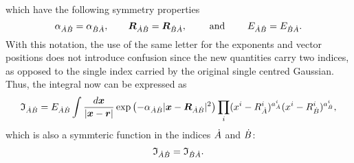 %
which have the following symmetry properties
\begin{equation}
   \alpha_{\dot{A}\dot{B}}=\alpha_{\dot{B}\dot{A}},\qquad\boldsymbol{R}_{\dot{A}\dot{B}}=\boldsymbol{R}_{\dot{B}\dot{A}},\qquad\textrm{ and }
   \qquad E_{\dot{A}\dot{B}}=E_{\dot{B}\dot{A}}.
\end{equation}
With this notation, the use of the same letter for the exponents and vector positions does not introduce confusion since the new quantities carry two indices, as opposed to the single index carried by the original single centred Gaussian. Thus, the integral now can be expressed as
%
\begin{equation}\label{eq:iabred}
   \mathfrak{I}_{\dot{A}\dot{B}}=E_{\dot{A}\dot{B}}\int\frac{d\boldsymbol{x}}{|\boldsymbol{x}-\boldsymbol{r}|}
      \exp\left(-\alpha_{\dot{A}\dot{B}}|\boldsymbol{x}-\boldsymbol{R}_{\dot{A}\dot{B}}|^2\right)
      \prod_i(x^i-R_{\dot{A}}^i)^{a_{\dot{A}}^i}(x^i-R_{\dot{B}}^i)^{a_{\dot{B}}^i},
\end{equation}
%
which is also a symmteric function in the indices $\dot{A}$ and $\dot{B}$:
\begin{equation}
   \mathfrak{I}_{\dot{A}\dot{B}}=\mathfrak{I}_{\dot{B}\dot{A}}.
\end{equation}

